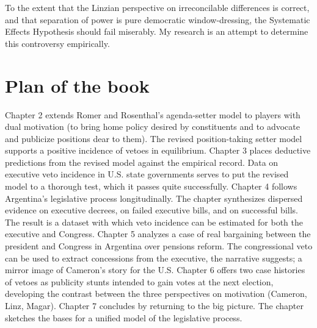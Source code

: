 To the extent that the Linzian perspective on irreconcilable differences is correct, and that separation of power is pure democratic window-dressing, the Systematic Effects Hypothesis should fail miserably.  My research is an attempt to determine this controversy empirically.  

\section{Plan of the book}

Chapter 2 extends Romer and Rosenthal's \citeyearpar{romer.rosenthal.1978} agenda-setter model to players with dual motivation (to bring home policy desired by constituents and to advocate and publicize positions dear to them).  The revised position-taking setter model supports a positive incidence of vetoes in equilibrium.  Chapter 3 places deductive predictions from the revised model against the empirical record.  Data on executive veto incidence in U.S. state governments serves to put the revised model to a thorough test, which it passes quite successfully.  Chapter 4 follows Argentina's legislative process longitudinally.  The chapter synthesizes dispersed evidence on executive decrees, on failed executive bills, and on successful bills.  The result is a dataset with which veto incidence can be estimated for both the executive and Congress.  Chapter 5 analyzes a case of real bargaining between the president and Congress in Argentina over pensions reform.  The congressional veto can be used to extract concessions from the executive, the narrative suggests; a mirror image of Cameron's story for the U.S.  Chapter 6 offers two case histories of vetoes as publicity stunts intended to gain votes at the next election, developing the contrast between the three perspectives on motivation (Cameron, Linz, Magar).  Chapter 7 concludes by returning to the big picture.  The chapter sketches the bases for a unified model of the legislative process.  



